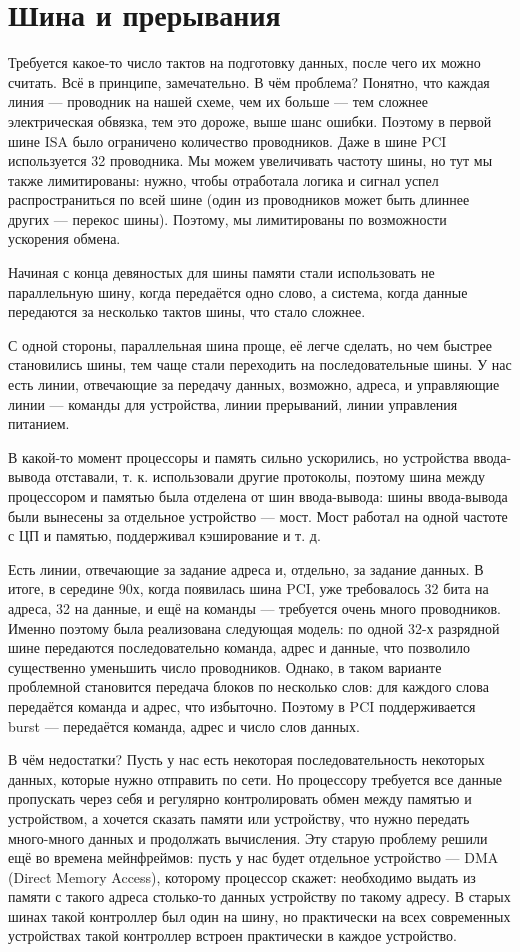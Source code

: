 \documentclass[main.tex]{subfiles}
\begin{document}
\section{Шина и прерывания}
Требуется какое-то число тактов на подготовку данных, после чего их можно считать.
Всё в принципе, замечательно. В чём проблема?
Понятно, что каждая линия --- проводник на нашей схеме, чем их больше ---
тем сложнее электрическая обвязка, тем это дороже, выше шанс ошибки.
Поэтому в первой шине ISA
было ограничено количество проводников. Даже в шине PCI используется 32 проводника.
Мы можем увеличивать частоту шины, но тут мы также лимитированы: нужно, чтобы
отработала логика и сигнал успел распространиться по всей шине
(один из проводников может быть длиннее других --- перекос шины).
Поэтому, мы лимитированы по возможности ускорения обмена.

Начиная с конца девяностых для шины памяти стали использовать не параллельную
шину, когда передаётся одно слово, а система, когда данные передаются за несколько
тактов шины, что стало сложнее.

С одной стороны, параллельная шина проще, её легче сделать, но чем быстрее
становились шины, тем чаще стали переходить на последовательные шины.
У нас есть линии, отвечающие за передачу данных, возможно, адреса, и управляющие
линии --- команды для устройства, линии прерываний, линии управления питанием.

В какой-то момент процессоры и память сильно ускорились, но устройства ввода-вывода
отставали, т. к. использовали другие протоколы, поэтому шина между процессором
и памятью была отделена от шин ввода-вывода: шины ввода-вывода были вынесены за
отдельное устройство --- мост. Мост работал на одной частоте с ЦП и памятью,
поддерживал кэширование и т. д.

Есть линии, отвечающие за задание адреса и, отдельно, за задание данных.
В итоге, в середине 90х, когда появилась шина PCI, уже требовалось
32 бита на адреса, 32 на данные, и ещё на команды --- требуется очень много
проводников. Именно поэтому была реализована следующая модель:
по одной 32-х разрядной шине передаются последовательно команда, адрес
и данные, что позволило существенно уменьшить число проводников.
Однако, в таком варианте проблемной становится передача блоков по
несколько слов: для каждого слова передаётся команда и адрес,
что избыточно. Поэтому в PCI поддерживается burst --- передаётся
команда, адрес и число слов данных.

В чём недостатки? Пусть у нас есть некоторая последовательность некоторых данных,
которые нужно отправить по сети. Но процессору требуется все данные пропускать
через себя и регулярно контролировать обмен между памятью и устройством, а
хочется сказать памяти или устройству, что нужно передать много-много данных
и продолжать вычисления. Эту старую проблему решили ещё во времена мейнфреймов:
пусть у нас будет отдельное устройство --- DMA (Direct Memory Access), которому процессор скажет:
необходимо выдать из памяти с такого адреса столько-то данных устройству по
такому адресу. В старых шинах такой контроллер был один на шину, но практически
на всех современных устройствах такой контроллер встроен практически в каждое
устройство.
\end{document}

